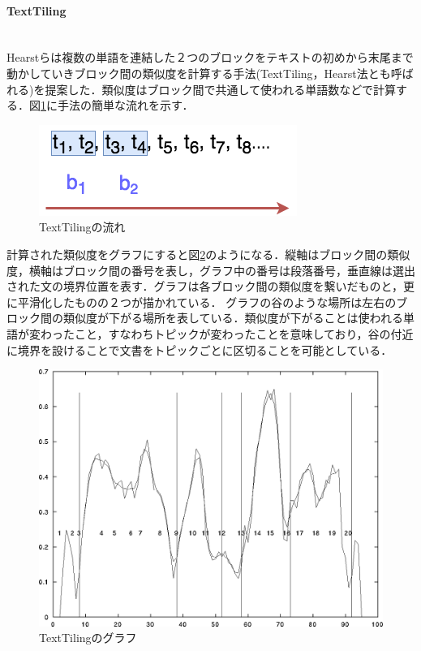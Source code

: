 \paragraph{TextTiling}\ \\
Hearstら\cite{texttiling}は複数の単語を連結した２つのブロックをテキストの初めから末尾まで動かしていきブロック間の類似度を計算する手法(TextTiling，Hearst法とも呼ばれる)を提案した．類似度はブロック間で共通して使われる単語数などで計算する．図\ref{Fig:textTilingFigure}に手法の簡単な流れを示す．
\begin{figure}[htbp]
 \begin{center}
  \includegraphics[width=\textwidth]{../images/2.Related_Work/textTiling-figure.png}
  \caption{TextTilingの流れ}
  \label{Fig:textTilingFigure}
  \vspace{-10pt}
 \end{center}
\end{figure}

計算された類似度をグラフにすると図\ref{Fig:textTilingGraph}のようになる．縦軸はブロック間の類似度，横軸はブロック間の番号を表し，グラフ中の番号は段落番号，垂直線は選出された文の境界位置を表す．グラフは各ブロック間の類似度を繋いだものと，更に平滑化したものの２つが描かれている．
グラフの谷のような場所は左右のブロック間の類似度が下がる場所を表している．類似度が下がることは使われる単語が変わったこと，すなわちトピックが変わったことを意味しており，谷の付近に境界を設けることで文書をトピックごとに区切ることを可能としている．
\begin{figure}[htbp]
 \begin{center}
  \includegraphics[width=\textwidth]{../images/2.Related_Work/textTiling-graph.png}
  \caption{TextTilingのグラフ}
  \label{Fig:textTilingGraph}
  \vspace{-10pt}
 \end{center}
\end{figure}

